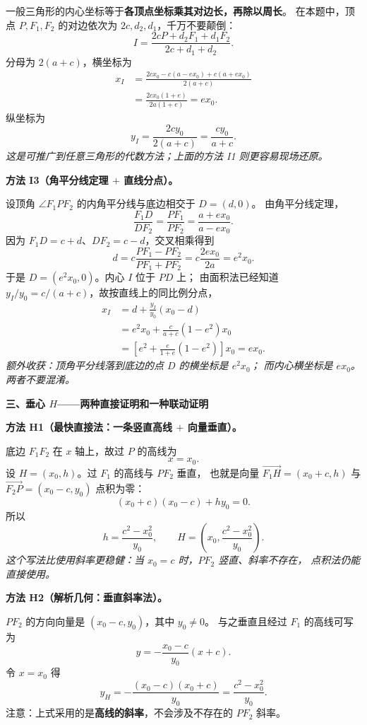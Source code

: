 \begin{proofbox}
一般三角形的内心坐标等于\textbf{各顶点坐标乘其对边长，再除以周长}。
在本题中，顶点 $P,F_1,F_2$ 的对边依次为
$2c,d_2,d_1$，千万不要颠倒：
\[
 I=\frac{2cP+d_2F_1+d_1F_2}{2c+d_1+d_2}.
\]
分母为 $2(a+c)$，横坐标为
\begin{align*}
 x_I
 &=\frac{2cx_0-c(a-ex_0)+c(a+ex_0)}{2(a+c)}\\
 &=\frac{2cx_0(1+e)}{2a(1+e)}
 =\boxed{ex_0}.
\end{align*}
纵坐标为
\[
 y_I=\frac{2cy_0}{2(a+c)}
 =\boxed{\frac{cy_0}{a+c}}.
\]
\textit{这是可推广到任意三角形的代数方法；上面的方法 I1 则更容易现场还原。}

\medskip
\textbf{方法 I3（角平分线定理 $+$ 直线分点）。}

设顶角 $\angle F_1PF_2$ 的内角平分线与底边相交于 $D=(d,0)$。
由角平分线定理，
\[
 \frac{F_1D}{DF_2}=\frac{PF_1}{PF_2}
 =\frac{a+ex_0}{a-ex_0}.
\]
因为 $F_1D=c+d$、$DF_2=c-d$，交叉相乘得到
\[
 d=c\frac{PF_1-PF_2}{PF_1+PF_2}
 =c\frac{2ex_0}{2a}=e^2x_0.
\]
于是 $D=(e^2x_0,0)$。内心 $I$ 位于 $PD$ 上；
由面积法已经知道 $y_I/y_0=c/(a+c)$，故按直线上的同比例分点，
\begin{align*}
 x_I
 &=d+\frac{y_I}{y_0}(x_0-d)\\
 &=e^2x_0+\frac{c}{a+c}(1-e^2)x_0\\
 &=\left[e^2+\frac{e}{1+e}(1-e^2)\right]x_0
 =\boxed{ex_0}.
\end{align*}
\textit{额外收获：顶角平分线落到底边的点 $D$ 的横坐标是 $e^2x_0$；
而内心横坐标是 $ex_0$。两者不要混淆。}

\tcbline
\textbf{三、垂心 $H$——两种直接证明和一种联动证明}

\textbf{方法 H1（最快直接法：一条竖直高线 $+$ 向量垂直）。}

底边 $F_1F_2$ 在 $x$ 轴上，故过 $P$ 的高线为
\[
 \boxed{x=x_0}.
\]
设 $H=(x_0,h)$。过 $F_1$ 的高线与 $PF_2$ 垂直，
也就是向量 $\overrightarrow{F_1H}=(x_0+c,h)$
与 $\overrightarrow{F_2P}=(x_0-c,y_0)$ 点积为零：
\[
 (x_0+c)(x_0-c)+hy_0=0.
\]
所以
\[
 \boxed{h=\frac{c^2-x_0^2}{y_0}},\qquad
 \boxed{H=\left(x_0,\frac{c^2-x_0^2}{y_0}\right)}.
\]
\textit{这个写法比使用斜率更稳健：当 $x_0=c$ 时，$PF_2$ 竖直、斜率不存在，
点积法仍能直接使用。}

\medskip
\textbf{方法 H2（解析几何：垂直斜率法）。}

$PF_2$ 的方向向量是 $(x_0-c,y_0)$，其中 $y_0\ne0$。
与之垂直且经过 $F_1$ 的高线可写为
\[
 y=-\frac{x_0-c}{y_0}(x+c).
\]
令 $x=x_0$ 得
\[
 y_H=-\frac{(x_0-c)(x_0+c)}{y_0}
 =\frac{c^2-x_0^2}{y_0}.
\]
注意：上式采用的是\textbf{高线的斜率}，不会涉及不存在的 $PF_2$ 斜率。


\end{proofbox}
